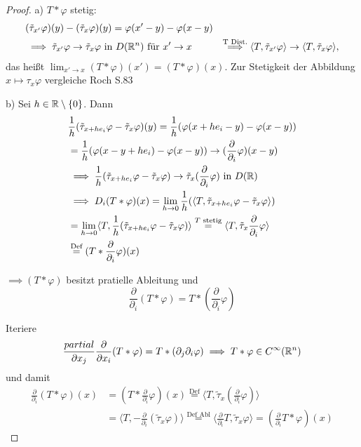 \begin{proof}
  a) $T \ast \varphi$ stetig:
  \begin{align*}
  &(\tilde\tau_{x'}\varphi)(y) - (\tilde\tau_x\varphi)(y)
  = \varphi(x' - y) - \varphi(x - y)\\
  &\implies \tilde\tau_{x'} \varphi \to \tilde\tau_x \varphi \text{ in } D(\mathbb{R}^n) \text{ für } x' \to x
  &\overset{\text{T Dist.}}{\implies} \langle T, \tilde\tau_{x'} \varphi \rangle \to \langle T, \tilde\tau_x \varphi \rangle,
  \end{align*}
  das heißt $\lim_{x' \to x} (T \ast \varphi)(x') = (T \ast \varphi)(x)$.
  {\tiny{Zur Stetigkeit der Abbildung $x \mapsto \tau_x \varphi$ vergleiche Roch S.83}}

  b) Sei $h \in \mathbb{R}\setminus\{0\}$. Dann
  \begin{align*}
    &\frac{1}{h} (\tilde\tau_{x + he_i} \varphi - \tilde\tau_x \varphi)(y)
    = \frac{1}{h} (\varphi(x + he_i - y) - \varphi(x - y)) \\
    &= \frac{1}{h} (\varphi(x - y + he_i) - \varphi(x - y)) \to (\frac{\partial}{\partial_i} \varphi)(x - y)\\
    &\implies \frac{1}{h} ( \tilde\tau_{x + he_i} \varphi - \tilde\tau_x \varphi) \to \tilde\tau_x (\frac{\partial}{\partial_i} \varphi) \text{ in } D(\mathbb{R}) \\
    &\implies D_i(T \ast \varphi)(x) 
    = \lim_{h \to 0} \frac{1}{h} ( \langle T, \tilde \tau_{x + he_i} \varphi - \tilde\tau_x \varphi \rangle) \\
    &= \lim_{h \to 0} \langle T, \frac{1}{h} ( \tilde \tau_{x + he_i} \varphi - \tilde\tau_x \varphi )\rangle 
    \overset{T \text{ stetig}}{=} \langle T, \tilde\tau_x \frac{\partial}{\partial_i} \varphi \rangle \\
    &\overset{\text{Def}}{=} (T \ast \frac{\partial}{\partial_i} \varphi)(x)
  \end{align*}

  $\implies (T \ast \varphi)$ besitzt pratielle Ableitung und 
  $$
  \frac{\partial}{\partial_i} (T \ast \varphi) = T \ast (\frac{\partial}{\partial_i} \varphi)
  $$

  Iteriere
  $$
  \frac{partial}{\partial x_j} \frac{\partial}{\partial x_i} (T \ast \varphi) = T \ast (\partial_j \partial_i \varphi) \implies T \ast \varphi \in C^\infty(\mathbb{R}^n)
  $$
  und damit
  \begin{align*}
    \frac{\partial}{\partial_i} (T \ast \varphi)(x) 
    &= (T \ast \frac{\partial}{\partial_i} \varphi)(x)
    \overset{\text{Def}}{=} \langle T, \tilde\tau_x (\frac{\partial}{\partial_i} \varphi) \rangle \\
    &= \langle T, -\frac{\partial}{\partial_i}(\tilde\tau_x \varphi) \rangle
    \overset{\text{Def Abl}}{=} \langle \frac{\partial}{\partial_i} T, \tilde\tau_x \varphi \rangle
    =(\frac{\partial}{\partial_i} T \ast \varphi)(x)
  \end{align*}
\end{proof}


